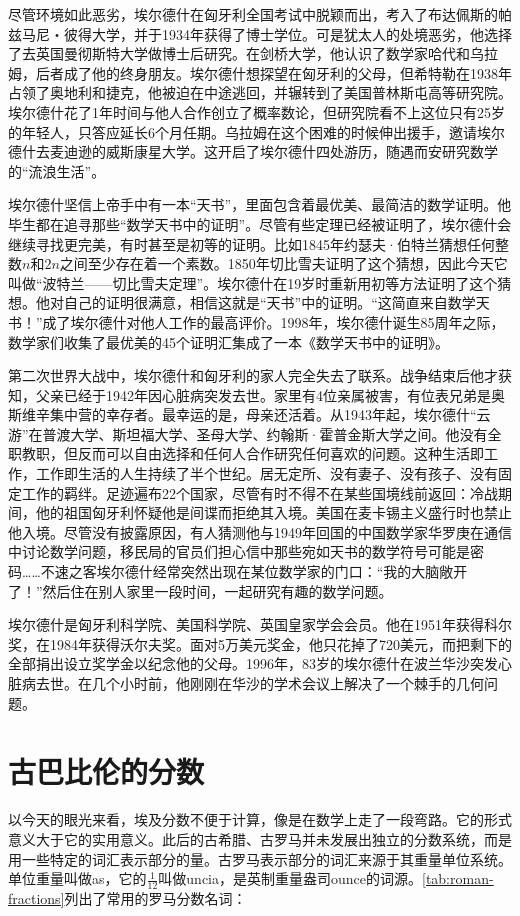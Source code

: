 \documentclass[b5paper]{ctexart}
\begin{document}
\begin{mdframed}
尽管环境如此恶劣，埃尔德什在匈牙利全国考试中脱颖而出，考入了布达佩斯的帕兹马尼・彼得大学，并于1934年获得了博士学位。可是犹太人的处境恶劣，他选择了去英国曼彻斯特大学做博士后研究。在剑桥大学，他认识了数学家哈代和乌拉姆，后者成了他的终身朋友。埃尔德什想探望在匈牙利的父母，但希特勒在1938年占领了奥地利和捷克，他被迫在中途逃回，并辗转到了美国普林斯屯高等研究院。埃尔德什花了1年时间与他人合作创立了概率数论，但研究院看不上这位只有25岁的年轻人，只答应延长6个月任期。乌拉姆在这个困难的时候伸出援手，邀请埃尔德什去麦迪逊的威斯康星大学。这开启了埃尔德什四处游历，随遇而安研究数学的“流浪生活”。

埃尔德什坚信上帝手中有一本“天书”，里面包含着最优美、最简洁的数学证明。他毕生都在追寻那些“数学天书中的证明”。尽管有些定理已经被证明了，埃尔德什会继续寻找更完美，有时甚至是初等的证明。比如1845年约瑟夫·伯特兰猜想任何整数$n$和$2n$之间至少存在着一个素数。1850年切比雪夫证明了这个猜想，因此今天它叫做“波特兰——切比雪夫定理”。埃尔德什在19岁时重新用初等方法证明了这个猜想。他对自己的证明很满意，相信这就是“天书”中的证明。“这简直来自数学天书！”成了埃尔德什对他人工作的最高评价。1998年，埃尔德什诞生85周年之际，数学家们收集了最优美的45个证明汇集成了一本《数学天书中的证明》。

第二次世界大战中，埃尔德什和匈牙利的家人完全失去了联系。战争结束后他才获知，父亲已经于1942年因心脏病突发去世。家里有4位亲属被害，有位表兄弟是奥斯维辛集中营的幸存者。最幸运的是，母亲还活着。从1943年起，埃尔德什“云游”在普渡大学、斯坦福大学、圣母大学、约翰斯·霍普金斯大学之间。他没有全职教职，但反而可以自由选择和任何人合作研究任何喜欢的问题。这种生活即工作，工作即生活的人生持续了半个世纪。居无定所、没有妻子、没有孩子、没有固定工作的羁绊。足迹遍布22个国家，尽管有时不得不在某些国境线前返回：冷战期间，他的祖国匈牙利怀疑他是间谍而拒绝其入境。美国在麦卡锡主义盛行时也禁止他入境。尽管没有披露原因，有人猜测他与1949年回国的中国数学家华罗庚在通信中讨论数学问题，移民局的官员们担心信中那些宛如天书的数学符号可能是密码……\cite{MacTutor-Erdos-2000}不速之客埃尔德什经常突然出现在某位数学家的门口：“我的大脑敞开了！”然后住在别人家里一段时间，一起研究有趣的数学问题。

埃尔德什是匈牙利科学院、美国科学院、英国皇家学会会员。他在1951年获得科尔奖，在1984年获得沃尔夫奖。面对5万美元奖金，他只花掉了720美元，而把剩下的全部捐出设立奖学金以纪念他的父母。1996年，83岁的埃尔德什在波兰华沙突发心脏病去世。在几个小时前，他刚刚在华沙的学术会议上解决了一个棘手的几何问题。

\end{mdframed}


\section{古巴比伦的分数}
以今天的眼光来看，埃及分数不便于计算，像是在数学上走了一段弯路。它的形式意义大于它的实用意义。此后的古希腊、古罗马并未发展出独立的分数系统，而是用一些特定的词汇表示部分的量。古罗马表示部分的词汇来源于其重量单位系统。单位重量叫做as，它的$\frac{1}{12}$叫做uncia，是英制重量盎司ounce的词源。\cref{tab:roman-fractions}列出了常用的罗马分数名词：
\end{document}
